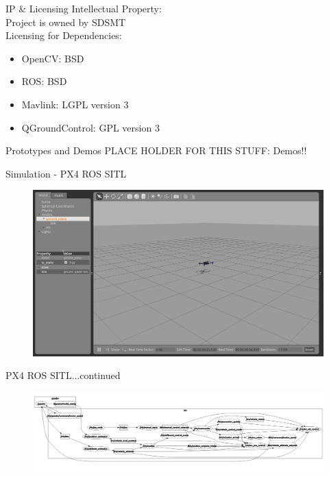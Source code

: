 \documentclass[11pt]{beamer}
\begin{document}
\begin{frame}{IP \& Licensing}
Intellectual Property:\\
Project is owned by SDSMT\\
\vspace{4mm}
Licensing for Dependencies:
\begin{itemize}
\item OpenCV: BSD 
\item ROS: BSD
\item Mavlink: LGPL version 3
\item QGroundControl: GPL version 3
\end{itemize}


\end{frame}



\begin{frame}{Prototypes and Demos}
PLACE HOLDER FOR THIS STUFF:
Demos!!
\end{frame}




\begin{frame}{Simulation - PX4 ROS SITL}
\begin{figure}
\includegraphics[width=1\textwidth]{images/flight1}
\end{figure}
\end{frame}

\begin{frame}{PX4 ROS SITL...continued}
\begin{figure}
\includegraphics[width=1\textwidth]{images/px4graph}
\end{figure}
\end{frame}
\end{document}
